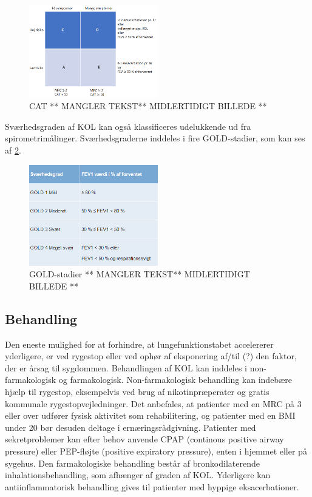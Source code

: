 \begin{figure} [H]
\centering
\includegraphics[width=0.5\textwidth]{figures/CAT}
\caption{CAT ** MANGLER TEKST** MIDLERTIDIGT BILLEDE ** \cite{Basisbogen2016, Sundhed2013}}
\label{fig:CAT}
\end{figure} 

Sværhedsgraden af KOL kan også klassificeres udelukkende ud fra spirometrimålinger. Sværhedsgraderne inddeles i fire GOLD-stadier, som kan ses af \ref{fig:GOLD}.

\begin{figure} [H]
\centering
\includegraphics[width=0.5\textwidth]{figures/GOLD}
\caption{GOLD-stadier ** MANGLER TEKST** MIDLERTIDIGT BILLEDE ** \cite{Basisbogen2016, Sundhed2013}}
\label{fig:GOLD}
\end{figure} 

\subsection{Behandling}
Den eneste mulighed for at forhindre, at lungefunktionstabet accelererer yderligere, er ved rygestop eller ved ophør af eksponering af/til (?) den faktor, der er årsag til sygdommen.
Behandlingen af KOL kan inddeles i non-farmakologisk og farmakologisk. Non-farmakologisk behandling kan indebære hjælp til rygestop, eksempelvis ved brug af nikotinpræperater og gratis kommunale rygestopvejledninger. Det anbefales, at patienter med en MRC på 3 eller over udfører fysisk aktivitet som rehabilitering, og patienter med en BMI under 20 bør desuden deltage i ernæringsrådgivning. Patienter med sekretproblemer kan efter behov anvende CPAP (continous positive airway pressure) eller PEP-fløjte (positive expiratory pressure), enten i hjemmet eller på sygehus.
Den farmakologiske behandling består af bronkodilaterende inhalationsbehandling, som afhænger af graden af KOL. Yderligere kan antiinflammatorisk behandling gives til patienter med hyppige eksacerbationer. \cite{Basisbogen2016}
 
